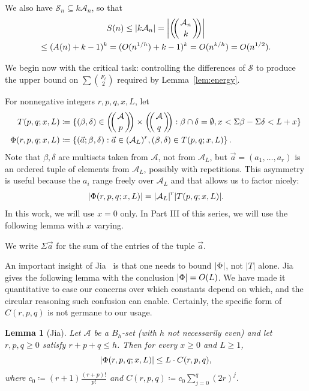 \documentclass[10pt,letterpaper]{article}
\newcommand{\cA}{\mathcal{A}}
\newcommand{\cS}{\mathcal{S}}
\DeclarePairedDelimiter{\abs}{\lvert}{\rvert}
\newcommand{\multibinom}[2]{\left(\kern-0.3em\left(\genfrac{}{}{0pt}{}{#1}{#2}\right)\kern-0.3em\right)}
\newtheorem{lem}[thm]{Lemma}
\theoremstyle{remark}
\begin{document}
We also have $\cS_n \subseteq k\cA_n$, so that
  \begin{multline}\label{eq:S(n) = O(sqrt n)}
    S(n) \le |k\cA_n| = \abs*{\multibinom{\cA_n}{k}} \\
  \le (A(n)+k-1)^k = (O(n^{1/h})+k-1)^k = O(n^{k/h})=O(n^{1/2}).
  \end{multline}

We begin now with the critical task: controlling the differences of $\cS$ to produce the upper bound on $\sum \binom{F_\ell}{2}$ required by Lemma~\ref{lem:energy}.

For nonnegative integers $r,p,q,x,L$, let
\begin{align*}
  T(p,q;x,L)
  &\coloneqq \{(\beta,\delta)\in \multibinom{\cA}{p} \times \multibinom{\cA}{q} :
     \beta\cap\delta=\emptyset,x<\Sigma\beta-\Sigma\delta<L+x\} \\
  \Phi(r,p,q;x,L)
   &\coloneqq \left\{(\vec a;\beta,\delta):
     \vec a \in (\cA_L)^r , 
     (\beta,\delta) \in T(p,q;x,L)\right\}.
\end{align*}
Note that $\beta,\delta$ are multisets taken from $\cA$, not from $\cA_L$, but $\vec a = (a_1,\dots,a_r )$ is an ordered tuple of elements from $\cA_L$, possibly with repetitions. This asymmetry is useful because the
$a_i$ range freely over $\cA_L$ and that allows us to factor nicely:
\begin{equation}\label{eq:factor Phi}
   \abs*{\Phi(r ,p,q;x,L)} = \abs*{\cA_L}^r \abs*{T(p,q;x,L)}.
\end{equation}
In this work, we will use $x=0$ only. In Part III of this series, we will use the following lemma with $x$ varying.

We write $\Sigma \vec a$ for the sum of the entries of the tuple $\vec a$.

An important insight of Jia~\cite{1994.Jia} is that one needs to bound $\abs{\Phi}$, not $|T|$ alone.
Jia gives the following lemma with the conclusion $\abs{\Phi} = O(L)$. 
We have made it quantitative to ease our concerns over which constants depend on which, and the circular reasoning such confusion can enable. 
Certainly, the specific form of $C(r,p,q)$ is not germane to our usage.

\begin{lem}[Jia]\label{lem:jia}
Let $\cA$ be a $B_{h}$-set (with $h$ not necessarily even) and let $r,p,q\ge0$ satisfy $r+p+q\le h$.  
Then for every $x \ge 0$ and $L \ge 1$,
\[
   \abs*{\Phi(r,p,q;x,L)} \le L \cdot C(r,p,q),
\]
where \(c_0 \coloneqq (r+1)\frac{(r+p)!}{p!}\) and \(C(r,p,q) \coloneqq c_0 \sum_{j=0}^{q}(2r)^{j}.\)
\end{lem}
\end{document}
